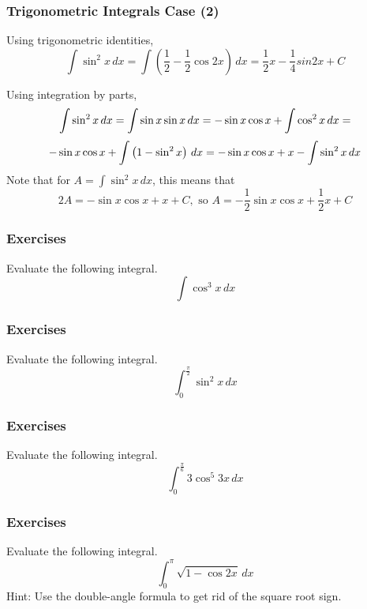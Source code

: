 \documentclass[xcolor=dvipsnames]{beamer}
\begin{document}
\begin{frame}
  \frametitle{Trigonometric Integrals Case (2)}
Using trigonometric identities,
\begin{equation}
  \label{eq:aoyoodof}
  \int\sin^{2}x\,dx=\int\left(\frac{1}{2}-\frac{1}{2}\cos{}2x\right)\,dx=\frac{1}{2}x-\frac{1}{4}sin{}2x+C
\end{equation}

Using integration by parts,
\begin{equation}
  \label{eq:hezaifoo}
  \int\sin^{2}x\,dx=\int\sin{}x\sin{}x\,dx=-\sin{}x\cos{}x+\int\cos^{2}x\,dx=\notag
\end{equation}
\begin{equation}
  \label{eq:uophaequ}
  -\sin{}x\cos{}x+\int\left(1-\sin^{2}x\right)\,dx=-\sin{}x\cos{}x+x-\int\sin^{2}x\,dx\notag
\end{equation}
Note that for $A=\int\sin^{2}x\,dx$, this means that
\begin{equation}
  \label{eq:uupheilu}
  2A=-\sin{}x\cos{}x+x+C,\mbox{ so }A=-\frac{1}{2}\sin{}x\cos{}x+\frac{1}{2}x+C
\end{equation}
\end{frame}

\begin{frame}
  \frametitle{Exercises}
  {\ubung} Evaluate the following integral.
  \begin{equation}
    \label{eq:uejahgai}
    \int\cos^{3}x\,dx
  \end{equation}
\end{frame}

\begin{frame}
  \frametitle{Exercises}
  {\ubung} Evaluate the following integral.
  \begin{equation}
    \label{eq:ufiurugo}
    \int_{0}^{\frac{\pi}{2}}\sin^{2}x\,dx
  \end{equation}
\end{frame}

\begin{frame}
  \frametitle{Exercises}
  {\ubung} Evaluate the following integral.
  \begin{equation}
    \label{eq:iepahgai}
    \int_{0}^{\frac{\pi}{6}}3\cos^{5}3x\,dx
  \end{equation}
\end{frame}

\begin{frame}
  \frametitle{Exercises}
  {\ubung} Evaluate the following integral.
  \begin{equation}
    \label{eq:koquohge}
    \int_{0}^{\pi}\sqrt{1-\cos{}2x}\,dx
  \end{equation}
  Hint: Use the double-angle formula to get rid of the square root
  sign.
\end{frame}
\end{document}
